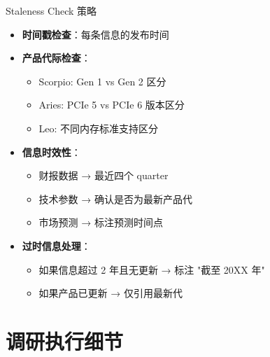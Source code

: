 \documentclass[UTF8,11pt,aspectratio=169]{beamer}
\begin{document}
\begin{frame}{Staleness Check 策略}
    \begin{itemize}
        \item \textbf{时间戳检查}：每条信息的发布时间
        \item \textbf{产品代际检查}：
            \begin{itemize}
                \item Scorpio: Gen 1 vs Gen 2 区分
                \item Aries: PCIe 5 vs PCIe 6 版本区分
                \item Leo: 不同内存标准支持区分
            \end{itemize}
        \item \textbf{信息时效性}：
            \begin{itemize}
                \item 财报数据 → 最近四个 quarter
                \item 技术参数 → 确认是否为最新产品代
                \item 市场预测 → 标注预测时间点
            \end{itemize}
        \item \textbf{过时信息处理}：
            \begin{itemize}
                \item 如果信息超过 2 年且无更新 → 标注 "截至 20XX 年"
                \item 如果产品已更新 → 仅引用最新代
            \end{itemize}
    \end{itemize}
\end{frame}

\section{调研执行细节}
\end{document}
